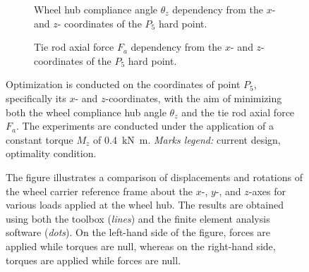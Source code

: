 \begin{figure}[htb]
  \centering
    \begin{subfigure}[t]{0.49\textwidth}
    \small{}
    \caption{Wheel hub compliance angle $\theta_z$ dependency from the $x$- and $z$- coordinates of the $P_5$ hard point.}
    \label{app4:fig:variation_theta_z}
  \end{subfigure}
  \hfill
  \begin{subfigure}[t]{0.49\textwidth}
    \centering
    \small{}
    \caption{Tie rod axial force $F_a$ dependency from the $x$- and $z$- coordinates of the $P_5$ hard point.}
    \label{app4:fig:variation_force_tie}
  \end{subfigure}
  \caption{Optimization is conducted on the coordinates of point $P_5$, specifically its $x$- and $z$-coordinates, with the aim of minimizing both the wheel compliance hub angle $\theta_z$ and the tie rod axial force $F_a$. The experiments are conducted under the application of a constant torque $M_z$ of \SI{0.4}{\kilo\newton\meter}. \emph{Marks legend:} {\color{mycolor2}\raisebox{-.15pt}{\Large$\bullet$}} current design, {\color{mycolor5}\raisebox{-.15pt}{\Large$\bullet$}} optimality condition.}
  \label{app4:fig:optimization}
\end{figure}

\begin{figure}[htp!]
  \centering
  \small{}
  \caption{The figure illustrates a comparison of displacements and rotations of the wheel carrier reference frame about the $x$-, $y$-, and $z$-axes for various loads applied at the wheel hub. The results are obtained using both the \TrussMe{} toolbox (\emph{lines}) and the \Ansys{} finite element analysis software (\emph{dots}). On the left-hand side of the figure, forces are applied while torques are null, whereas on the right-hand side, torques are applied while forces are null.}
  \label{app4:fig:suspension_static_results}
\end{figure}

